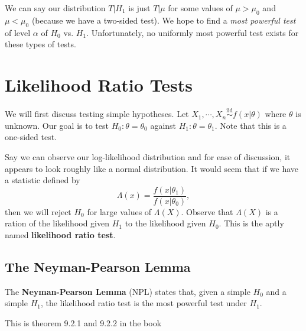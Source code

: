 \documentclass[titlepage, 12pt, leqno]{article}
\begin{document}
We can say our distribution $T|H_{1}$ is just $T | \mu$ for some values of
$\mu > \mu_{0}$ and $\mu < \mu_{0}$ (because we have a two-sided test). We
hope to find a \textit{most powerful test} of level $\alpha$ of $H_{0}$ vs.
$H_{1}$. Unfortunately, no uniformly most powerful test exists for these types
of tests.

\pagebreak
\section{Likelihood Ratio Tests}
We will first discuss testing simple hypotheses. Let $X_{1}, \cdots , X_{n}
\overset{\mathrm{iid}}{\sim} f(x|\theta)$ where $\theta$ is unknown. Our goal is
to test $H_{0}:\theta = \theta_{0}$ against $H_{1}:\theta = \theta_{1}$. Note that
this is a one-sided test.

Say we can observe our log-likelihood distribution and for ease of discussion,
it appears to look roughly like a normal distribution. It would seem that if
we have a statistic defined by
\[
\Lambda(x) = \frac{f(x|\theta_{1})}{f(x|\theta_{0})},
\]
then we will reject $H_{0}$ for large values of $\Lambda(X)$. Observe that
$\Lambda(X)$ is a ration of the likelihood given $H_{1}$ to the likelihood
given $H_{0}$. This is the aptly named \textbf{likelihood ratio test}.

\subsection{The Neyman-Pearson Lemma}
\begin{definition}
The \textbf{Neyman-Pearson Lemma }(NPL) states that, given a simple $H_{0}$ and
a simple $H_{1}$, the likelihood ratio test is the most powerful
test under $H_{1}$.
\begin{note}
    This is theorem 9.2.1 and 9.2.2 in the book
\end{note}
\end{definition}
\end{document}

